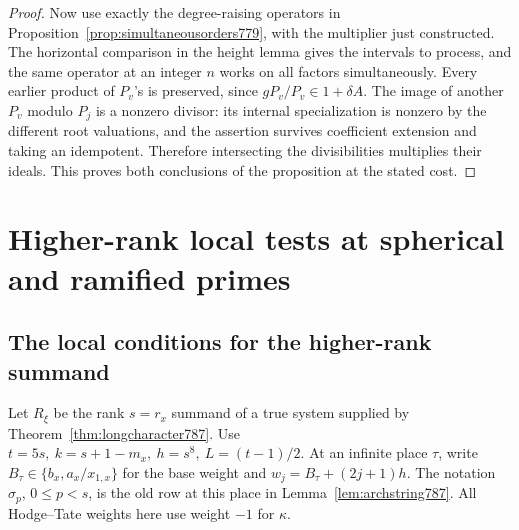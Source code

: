 \documentclass[a4paper,11pt]{article}
\theoremstyle{definition}
\theoremstyle{remark}
\numberwithin{equation}{section}
\begin{document}
\begin{proof}
Now use exactly the degree-raising operators in
Proposition~\ref{prop:simultaneousorders779}, with the
multiplier just constructed. The horizontal comparison
in the height lemma gives the intervals to process,
and the same operator at an integer \(n\) works on all
factors simultaneously. Every earlier product of
\(P_v\)'s is preserved, since \(gP_v/P_v\in1+\delta A\).
The image of another \(P_v\) modulo \(P_j\) is a
nonzero divisor: its internal specialization is nonzero
by the different root valuations, and the assertion
survives coefficient extension and taking an idempotent.
Therefore intersecting the divisibilities multiplies
their ideals. This proves both conclusions of the
proposition at the stated cost.
\end{proof}
\clearpage

\section{Higher-rank local tests at spherical and ramified primes}\label{nav:higher-rank-tests}

\subsection{The local conditions for the higher-rank summand}
\label{sec:highlocal788}
Let \(R_\xi\) be the rank \(s=r_x\) summand of a true
system supplied by Theorem~\ref{thm:longcharacter787}.
Use \(t=5s,\ k=s+1-m_x,\ h=s^8,\ L=(t-1)/2\).
At an infinite place \(\tau\), write
\(B_\tau\in\{b_x,a_x/x_{1,x}\}\) for the base weight
and \(w_j=B_\tau+(2j+1)h\).
The notation \(\sigma_p\), \(0\le p<s\), is the old row
at this place in Lemma~\ref{lem:archstring787}. All
Hodge--Tate weights here use weight \(-1\) for \(\kappa\).
\end{document}

